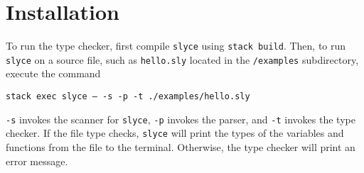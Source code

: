 \section{Installation}
 To run the type checker, first compile \texttt{slyce} using \texttt{stack build}. 
 Then, to run \texttt{slyce} on a source file, such as \texttt{hello.sly} located in the \texttt{/examples} subdirectory, execute the command\newline\centerline{\texttt{stack exec slyce -- -s -p -t ./examples/hello.sly}}\newline
 \texttt{-s} invokes the scanner for \texttt{slyce}, \texttt{-p} invokes the parser, and \texttt{-t} invokes the type checker. 
 If the file type checks, \texttt{slyce} will print the types of the variables and functions from the file to the terminal.
 Otherwise, the type checker will print an error message. 